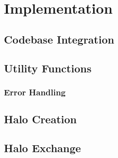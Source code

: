\chapter{Implementation}

\section{Codebase Integration}

\section{Utility Functions}

\subsection{Error Handling}

\section{Halo Creation}

\section{Halo Exchange}

